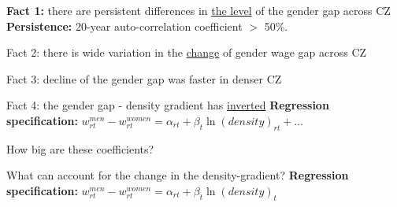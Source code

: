 \begin{frame}{\textbf{Fact 1:} there are persistent differences in \underline{the level} of the gender gap across CZ} 
\label{slide:fact1}
{\scriptsize}
\textbf{\alert{Persistence:}} 20-year auto-correlation coefficient $>$ 50\%.

\hspace{1cm} 
\end{frame}

\begin{frame}{Fact 2: there is wide variation in the \underline{change} of gender wage gap across CZ}

\end{frame}
\begin{frame}{Fact 3: decline of the gender gap was faster in denser CZ}  				
	
\end{frame}
\begin{frame}{Fact 4: the gender gap - density gradient has \underline{inverted}}
	\label{slide:baseline}
	\textbf{\alert{Regression specification:}}	$w^{men}_{rt}-w^{women}_{rt}=\alpha_{rt}+\beta_{t}\ln(density)_{rt}+ \dots$
	
 \hspace{.5cm} 		 \hspace{.5cm} 	 \hspace{.5cm}			
\end{frame}
\begin{frame}{How big are these coefficients?}  
		
\end{frame}
\begin{frame}{What can account for the change in the density-gradient?}
	\label{slide:controls}
	\textbf{\alert{Regression specification:}} $w^{men}_{rt}-w^{women}_{rt}=\alpha_{rt}+\beta_{t}\ln(density)_t$
	
\end{frame}
